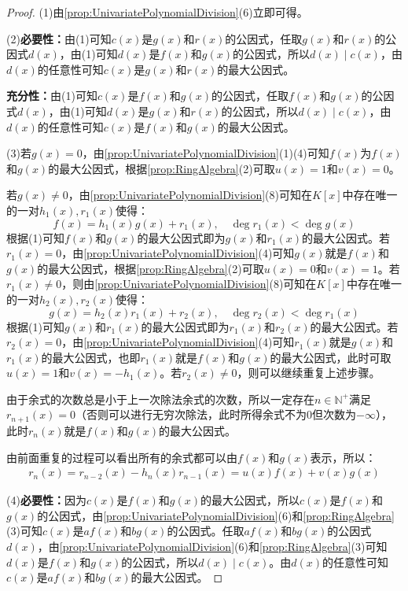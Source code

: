 \begin{proof}
	(1)由\cref{prop:UnivariatePolynomialDivision}(6)立即可得。\par
	(2)\textbf{必要性：}由(1)可知$c(x)$是$g(x)$和$r(x)$的公因式，任取$g(x)$和$r(x)$的公因式$d(x)$，由(1)可知$d(x)$是$f(x)$和$g(x)$的公因式，所以$d(x)\mid c(x)$，由$d(x)$的任意性可知$c(x)$是$g(x)$和$r(x)$的最大公因式。\par
	\textbf{充分性：}由(1)可知$c(x)$是$f(x)$和$g(x)$的公因式，任取$f(x)$和$g(x)$的公因式$d(x)$，由(1)可知$d(x)$是$g(x)$和$r(x)$的公因式，所以$d(x)\mid c(x)$，由$d(x)$的任意性可知$c(x)$是$f(x)$和$g(x)$的最大公因式。\par
	(3)若$g(x)=0$，由\cref{prop:UnivariatePolynomialDivision}(1)(4)可知$f(x)$为$f(x)$和$g(x)$的最大公因式，根据\cref{prop:RingAlgebra}(2)可取$u(x)=1$和$v(x)=0$。\par
	若$g(x)\ne0$，由\cref{prop:UnivariatePolynomialDivision}(8)可知在$K[x]$中存在唯一的一对$h_1(x),r_1(x)$使得：
	\begin{equation*}
		f(x)=h_1(x)g(x)+r_1(x),\quad\deg r_1(x)<\deg g(x)
	\end{equation*}
	根据(1)可知$f(x)$和$g(x)$的最大公因式即为$g(x)$和$r_1(x)$的最大公因式。若$r_1(x)=0$，由\cref{prop:UnivariatePolynomialDivision}(4)可知$g(x)$就是$f(x)$和$g(x)$的最大公因式，根据\cref{prop:RingAlgebra}(2)可取$u(x)=0$和$v(x)=1$。若$r_1(x)\ne0$，则由\cref{prop:UnivariatePolynomialDivision}(8)可知在$K[x]$中存在唯一的一对$h_2(x),r_2(x)$使得：
	\begin{equation*}
		g(x)=h_2(x)r_1(x)+r_2(x),\quad\deg r_2(x)<\deg r_1(x)
	\end{equation*}
	根据(1)可知$g(x)$和$r_1(x)$的最大公因式即为$r_1(x)$和$r_2(x)$的最大公因式。若$r_2(x)=0$，由\cref{prop:UnivariatePolynomialDivision}(4)可知$r_1(x)$就是$g(x)$和$r_1(x)$的最大公因式，也即$r_1(x)$就是$f(x)$和$g(x)$的最大公因式，此时可取$u(x)=1$和$v(x)=-h_1(x)$。若$r_2(x)\ne0$，则可以继续重复上述步骤。\par
	由于余式的次数总是小于上一次除法余式的次数，所以一定存在$n\in\mathbb{N}^+$满足$r_{n+1}(x)=0$（否则可以进行无穷次除法，此时所得余式不为$0$但次数为$-\infty$），此时$r_n(x)$就是$f(x)$和$g(x)$的最大公因式。\par
	由前面重复的过程可以看出所有的余式都可以由$f(x)$和$g(x)$表示，所以：
	\begin{align*}
		r_n(x)=r_{n-2}(x)-h_n(x)r_{n-1}(x)=u(x)f(x)+v(x)g(x)
	\end{align*}\par
	(4)\textbf{必要性：}因为$c(x)$是$f(x)$和$g(x)$的最大公因式，所以$c(x)$是$f(x)$和$g(x)$的公因式，由\cref{prop:UnivariatePolynomialDivision}(6)和\cref{prop:RingAlgebra}(3)可知$c(x)$是$af(x)$和$bg(x)$的公因式。任取$af(x)$和$bg(x)$的公因式$d(x)$，由\cref{prop:UnivariatePolynomialDivision}(6)和\cref{prop:RingAlgebra}(3)可知$d(x)$是$f(x)$和$g(x)$的公因式，所以$d(x)\mid c(x)$。由$d(x)$的任意性可知$c(x)$是$af(x)$和$bg(x)$的最大公因式。\par

\end{proof}
